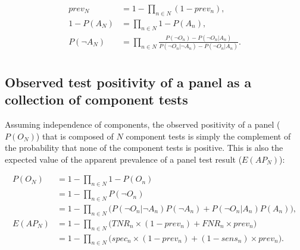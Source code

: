 \documentclass[a4paper, 12pt, twoside]{article}
\let\Oldsubsection\subsection
\renewcommand{\subsection}{\FloatBarrier\Oldsubsection}
\begin{document}
\begin{equation*}
\begin{aligned}
prev_N &= 1- \prod_{n \in N}{ (1-prev_n) }, \\
1-P(A_N) &= \prod_{n \in N}{1-P(A_n)}, \\
P(\neg A_N) &= \prod_{n \in N}{\frac{P(\neg O_n) - P(\neg O_n|A_n)}{P(\neg O_n|\neg A_n) - P(\neg O_n|A_n)}}. \\
\end{aligned}
\end{equation*}
%
%

\subsection{Observed test positivity of a panel as a collection of component tests}

Assuming independence of components, the observed positivity of a panel (\(P(O_N)\)) that is composed of \(N\) component tests is simply the complement of the probability that none of the component tests is positive. This is also the expected value of the apparent prevalence of a panel test result (\(E(AP_N)\)):

\begin{equation*}
\begin{aligned}
P(O_N) &= 1-\prod_{n \in N}{1-P(O_n)} \\
 &= 1-\prod_{n \in N}{P(\neg O_n)} \\
 &= 1-\prod_{n \in N}{ \bigg(P(\neg O_n|\neg A_n)P(\neg A_n) + P(\neg O_n|A_n)P(A_n)} \bigg), \\
E(AP_N) &= 1- \prod_{n \in N}{ \bigg(TNR_n \times (1-prev_n) + FNR_n \times prev_n} \bigg) \\
 &= 1- \prod_{n \in N}{ \bigg(spec_n \times (1-prev_n) + (1-sens_n) \times prev_n} \bigg). \\
\end{aligned}
\end{equation*}
\end{document}
